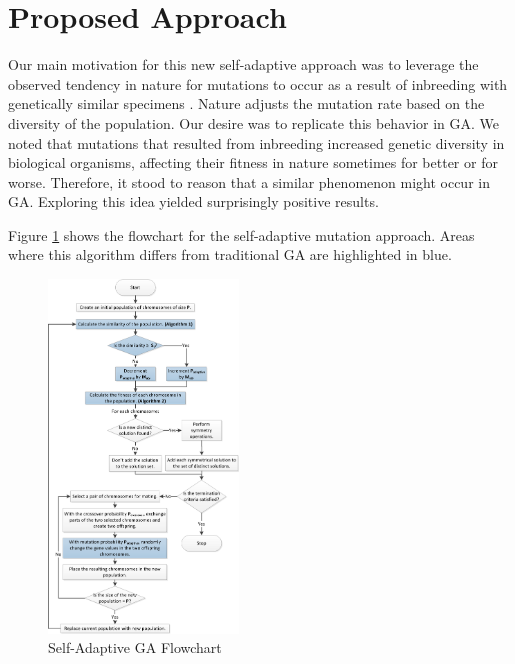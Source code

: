\documentclass[conference]{IEEEtran}
\begin{document}
\section{Proposed Approach}
Our main motivation for this new self-adaptive approach was to leverage the observed tendency in nature for mutations to occur as a result of inbreeding with genetically similar specimens \cite{cit:17,cit:18}. Nature adjusts the mutation rate based on the diversity of the population. Our desire was to replicate this behavior in GA. We noted that mutations that resulted from inbreeding increased genetic diversity in biological organisms, affecting their fitness in nature sometimes for better or for worse. Therefore, it stood to reason that a similar phenomenon might occur in GA. Exploring this idea yielded surprisingly positive results.

Figure \ref{fig:flowchart} shows the flowchart for the self-adaptive mutation approach. Areas where this algorithm differs from traditional GA are highlighted in blue.

\begin{figure}[h!]
\centerline{\includegraphics[width=0.45\textwidth]{figures/flowchart.png}}
\caption{Self-Adaptive GA Flowchart}
\label{fig:flowchart}
\end{figure}
\end{document}
